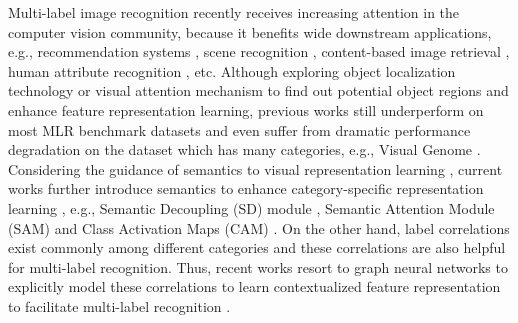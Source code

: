 \documentclass[lettersize,journal]{IEEEtran}
\begin{document}
Multi-label image recognition \cite{Wu2020AdaHGNN, Ridnik2021ASL, Gao2021MCAR, Chen2022KGGR} recently receives increasing attention in the computer vision community, because it benefits wide downstream applications, e.g., recommendation systems \cite{Carrillo2013Multi, Zheng2014Context}, scene recognition \cite{Chen2019RoadScene, zhang2020relational, LiuWL15tcyb}, content-based image retrieval \cite{Li2010Technique, Zhang2021Instance}, human attribute recognition \cite{Guo2019Visual, Zhu2017Multi,Chen2021Cross}, etc. Although exploring object localization technology \cite{wei2016hcp} or visual attention mechanism \cite{wang2017multi,chen2018recurrent} to find out potential object regions and enhance feature representation learning, previous works still underperform on most MLR benchmark datasets and even suffer from dramatic performance degradation on the dataset which has many categories, e.g., Visual Genome \cite{Krishna2017VG}. Considering the guidance of semantics to visual representation learning \cite{chen2021hsva}, current works further introduce semantics to enhance category-specific representation learning \cite{Chen2019SSGRL, Wu2020AdaHGNN}, e.g., Semantic Decoupling (SD) module \cite{Chen2019SSGRL, Wu2020AdaHGNN}, Semantic Attention Module (SAM) \cite{Ye2020ADD-GCN} and Class Activation Maps (CAM) \cite{Gao2021MCAR}. On the other hand, label correlations exist commonly among different categories and these correlations are also helpful for multi-label recognition. Thus, recent works resort to graph neural networks \cite{AbadalJGLA22csur,ChenCHWLL20aaai} to explicitly model these correlations to learn contextualized feature representation to facilitate multi-label recognition \cite{Chen2019ML-GCN, Chen2019SSGRL, Wu2020AdaHGNN, Ye2020ADD-GCN, Chen2022KGGR}.
\end{document}
